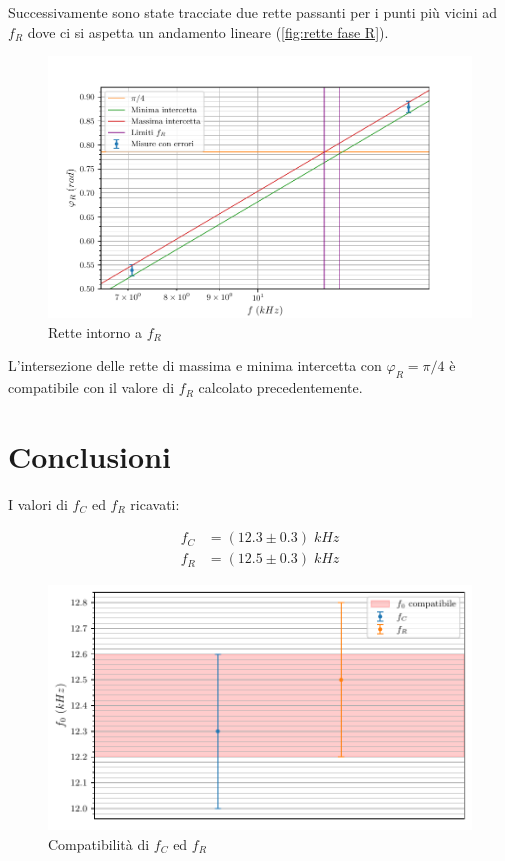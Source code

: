 \documentclass[11pt, a4paper]{article}
\numberwithin{equation}{section} %
\begin{document}
Successivamente sono state tracciate due rette passanti per i punti più vicini ad $f_{R}$ dove ci si aspetta un andamento lineare (\autoref{fig:rette fase R}).

\begin{figure}[ht!]
    \includegraphics{onda_sin_phi(f)_R_intercette.pdf}
    \caption{Rette intorno a $f_{R}$}
    \label{fig:rette fase R}
\end{figure}

\newpage

L'intersezione delle rette di massima e minima intercetta con $\varphi_{R} = \pi/4$ è compatibile con il valore di $f_{R}$ calcolato precedentemente.

\newpage

\section{Conclusioni}

I valori di $f_{C}$ ed $f_{R}$ ricavati:

\begin{align*}
    f_{C} &= (12.3 \pm 0.3) \; kHz \\
    f_{R} &= (12.5 \pm 0.3) \; kHz
\end{align*}

\begin{figure}[ht!]
    \includegraphics{f_0_compatibili.pdf}
    \caption{Compatibilità di $f_{C}$ ed $f_{R}$}
    \label{fig:fC ed fR compatibili}
\end{figure}
\end{document}
